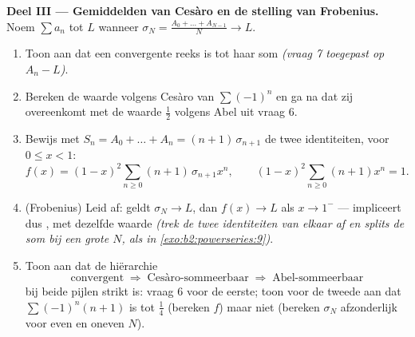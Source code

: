 \begin{problem}
\medskip
\noindent\textbf{Deel III --- Gemiddelden van Cesàro en de stelling
van Frobenius.} Noem $\sum a_n$ \emph{} tot $L$
wanneer $\sigma_N = \frac{A_0 + \dots + A_{N-1}}{N} \to L$.
\begin{enumerate}[resume]
  \item Toon aan dat een convergente reeks  is
        tot haar som \emph{(vraag 7 toegepast op $A_n - L$)}.
  \item Bereken de waarde volgens Cesàro van $\sum(-1)^n$ en ga na
        dat zij overeenkomt met de waarde $\frac12$ volgens Abel
        uit vraag 6.
  \item Bewijs met $S_n = A_0 + \dots + A_n = (n+1)\,\sigma_{n+1}$
        de twee identiteiten, voor $0 \leq x < 1$:
        \[
        f(x) = (1-x)^2\sum_{n\geq0}(n+1)\,\sigma_{n+1}x^n,
        \qquad
        (1-x)^2\sum_{n\geq0}(n+1)x^n = 1 .
        \]
  \item (Frobenius) Leid af: geldt $\sigma_N \to L$, dan $f(x) \to
        L$ als $x \to 1^-$ ---  impliceert dus
        , met dezelfde waarde \emph{(trek de twee
        identiteiten van elkaar af en splits de som bij een grote
        $N$, als in \cref{exo:b2:powerseries:9})}.
  \item Toon aan dat de hiërarchie
        \[
        \text{convergent} \;\Longrightarrow\;
        \text{Cesàro-sommeerbaar} \;\Longrightarrow\;
        \text{Abel-sommeerbaar}
        \]
        bij beide pijlen strikt is: vraag 6 voor de eerste; toon
        voor de tweede aan dat $\sum(-1)^n(n+1)$
         is tot $\frac14$ (bereken $f$) maar niet
         (bereken $\sigma_N$ afzonderlijk voor
        even en oneven $N$).
\end{enumerate}


\end{problem}
